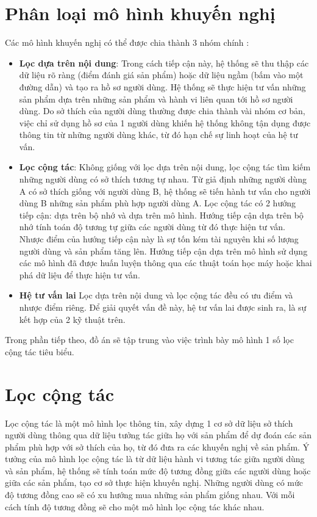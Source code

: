\section{Phân loại mô hình khuyến nghị}
Các mô hình khuyến nghị có thể được chia thành 3 nhóm chính \cite{goyani2020review}:
\begin{itemize}
    \item \textbf{Lọc dựa trên nội dung}: Trong cách tiếp cận này, hệ thống sẽ thu thập các dữ
    liệu rõ ràng (điểm đánh giá sản phẩm) hoặc dữ liệu ngầm (bấm vào một đường
    dẫn) và tạo ra hồ sơ người dùng. Hệ thống sẽ thực hiện tư vấn những sản phẩm
    dựa trên những sản phẩm và hành vi liên quan tới hồ sơ người dùng. Do sở thích 
    của người dùng thường được chia thành vài nhóm cơ bản, việc chỉ sử dụng hồ sơ
    của 1 người dùng khiến hệ thống không tận dụng được thông tin từ những người
    dùng khác, từ đó hạn chế sự linh hoạt của hệ tư vấn.

    \item \textbf{Lọc cộng tác}: Không giống với lọc dựa trên nội dung, lọc cộng tác tìm kiếm
    những người dùng có sở thích tương tự nhau. Từ giả định những người dùng A
    có sở thích giống với người dùng B, hệ thống sẽ tiến hành tư vấn cho người dùng
    B những sản phẩm phù hợp người dùng A. Lọc cộng tác có 2 hướng tiếp cận: dựa
    trên bộ nhớ và dựa trên mô hình. Hướng tiếp cận dựa trên bộ nhớ tính toán độ
    tương tự giữa các người dùng từ đó thực hiện tư vấn. Nhược điểm của hướng tiếp
    cận này là sự tốn kém tài nguyên khi số lượng người dùng và sản phẩm tăng lên.
    Hướng tiếp cận dựa trên mô hình sử dụng các mô hình đã được huấn luyện thông
    qua các thuật toán học máy hoặc khai phá dữ liệu để thực hiện tư vấn.

    \item \textbf{Hệ tư vấn lai} Lọc dựa trên nội dung và lọc cộng tác đều có ưu điểm và nhược
    điểm riêng. Để giải quyết vấn đề này, hệ tư vấn lai được sinh ra, là sự kết hợp
    của 2 kỹ thuật trên.
\end{itemize}

Trong phần tiếp theo, đồ án sẽ tập trung vào việc trình bày mô hình 1 số lọc cộng
tác tiêu biểu.

\section{Lọc cộng tác}
Lọc cộng tác là một mô hình lọc thông tin, xây dựng 1 cơ sở dữ liệu sở thích người dùng 
thông qua dữ liệu tưởng tác giữa họ với sản phẩm để dự đoán các sản phẩm phù hợp với sở thích của họ, 
từ đó đưa ra các khuyến nghị về sản phẩm. Ý tưởng của mô hình lọc cộng tác là từ dữ liệu hành vi
tương tác giữa người dùng và sản phẩm, hệ thống sẽ tính toán mức độ tương đồng giữa các người dùng
hoặc giữa các sản phẩm, tạo cơ sở thực hiện khuyến nghị. Những người dùng có mức độ tương đồng cao
sẽ có xu hướng mua những sản phẩm giống nhau. Với mỗi cách tính độ tương đồng sẽ cho một mô hình lọc cộng tác 
khác nhau.


